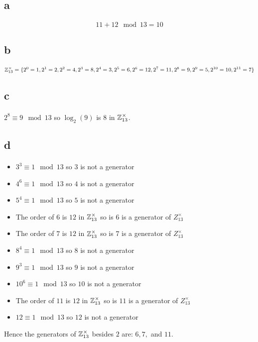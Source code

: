 \documentclass[letterpaper,12pt,oneside,onecolumn]{article}
\begin{document}
\section{}
\subsection{a}
\paragraph{}
$$11+12 \mod 13 = 10$$
\subsection{b}
\paragraph{}
$$\mathbb{Z}^\times_{13} = \{2^0=1, 2^1 = 2, 2^2 = 4, 2^3 = 8, 2^4 = 3, 2^5 = 6, 2^6=12, 2^7=11, 2^8 = 9, 2^9=5, 2^{10}=10, 2^{11} = 7\}$$
\subsection{c}
\paragraph{}
$2^8\equiv 9 \mod 13$ so $\log_2(9)$ is $8$ in $\mathbb{Z}^\times_{13}$.
\subsection{d}
\paragraph{}
\begin{itemize}
\item $3^3 \equiv 1 \mod 13$ so $3$ is not a generator
\item $4^6 \equiv 1 \mod 13$ so $4$ is not a generator
\item $5^4 \equiv 1 \mod 13$ so $5$ is not a generator
\item The order of $6$ is $12$ in $\mathbb{Z}_{13}^\times$ so is $6$ is a generator of $Z_{13}^\times$
\item The order of $7$ is $12$ in $\mathbb{Z}_{13}^\times$ so is $7$ is a generator of $Z_{13}^\times$
\item $8^4 \equiv 1 \mod 13$ so $8$ is not a generator
\item $9^3 \equiv 1 \mod 13$ so $9$ is not a generator
\item $10^6 \equiv 1 \mod 13$ so $10$ is not a generator
\item The order of $11$ is $12$ in $\mathbb{Z}_{13}^\times$ so is $11$ is a generator of $Z_{13}^\times$
\item $12 \equiv 1 \mod 13$ so $12$ is not a generator
\end{itemize}
Hence the generators of $\mathbb{Z}_{13}^\times$ besides $2$ are: $6,7,$ and $11$.
\end{document}
